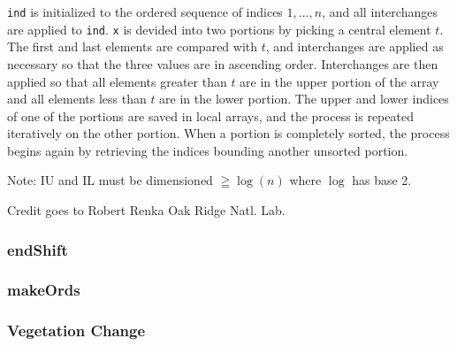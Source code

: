 \texttt{ind} is initialized to the ordered sequence of indices $1,\ldots,n$,
and all interchanges are applied to \texttt{ind}. \texttt{x} is devided
into two portions by picking a central element $t$. The first and
last elements are compared with $t$, and interchanges are applied
as necessary so that the three values are in ascending order. Interchanges
are then applied so that all elements greater than $t$ are in the
upper portion of the array and all elements less than $t$ are in
the lower portion. The upper and lower indices of one of the portions
are saved in local arrays, and the process is repeated iteratively
on the other portion. When a portion is completely sorted, the process
begins again by retrieving the indices bounding another unsorted portion.

Note: IU and IL must be dimensioned $\geqq\log(n)$ where $\log$
has base 2.

Credit goes to Robert Renka Oak Ridge Natl. Lab.

\subsubsection{endShift}



\subsubsection{makeOrds}



\begin{usessubs}
\end{usessubs}

\subsubsection{Vegetation Change}


